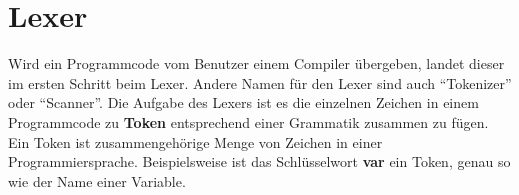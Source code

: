 \section{Lexer}
Wird ein Programmcode vom Benutzer einem Compiler übergeben, landet dieser im ersten Schritt beim Lexer. Andere Namen für den Lexer sind auch \enquote{Tokenizer} oder \enquote{Scanner}. Die Aufgabe des Lexers ist es die einzelnen Zeichen in einem Programmcode zu \textbf{Token} entsprechend einer Grammatik zusammen zu fügen. Ein Token ist zusammengehörige Menge von Zeichen in einer Programmiersprache. Beispielsweise ist das Schlüsselwort \textbf{var} ein Token, genau so wie der Name einer Variable. 